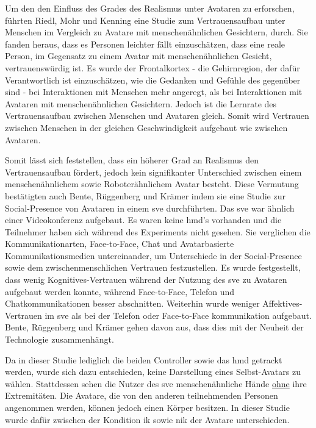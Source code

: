 \documentclass[a4paper,11pt]{article}%
\renewcommand{\\}{\vspace*{0.5\baselineskip} \newline}
\begin{document}
Um den den Einfluss des Grades des Realismus unter Avataren zu erforschen, führten Riedl, Mohr und Kenning \cite{riedl2014trusting} eine Studie zum Vertrauensaufbau unter Menschen im Vergleich zu Avatare mit menschenähnlichen Gesichtern, durch. Sie fanden heraus, dass es Personen leichter fällt einzuschätzen, dass eine reale Person, im Gegensatz zu einem Avatar mit menschenähnlichen Gesicht, vertrauenswürdig ist. Es wurde der Frontalkortex - die Gehirnregion, der dafür Verantwortlich ist einzuschätzen, wie die Gedanken und Gefühle des gegenüber sind - bei Interaktionen mit Menschen mehr angeregt, als bei Interaktionen mit Avataren mit menschenähnlichen Gesichtern.
Jedoch ist die Lernrate des Vertrauensaufbau zwischen Menschen und Avataren gleich. Somit wird Vertrauen zwischen Menschen in der gleichen Geschwindigkeit aufgebaut wie zwischen Avataren. \cite{riedl2014trusting}

Somit lässt sich feststellen, dass ein höherer Grad an Realismus den Vertrauensaufbau fördert, jedoch kein signifikanter Unterschied zwischen einem menschenähnlichem sowie Roboterähnlichem Avatar besteht. Diese Vermutung bestätigten auch Bente, Rüggenberg und Krämer \citep[p.54-59]{bente2004social} indem sie eine Studie zur Social-Presence von Avataren in einem \ac{sve} durchführten. Das \ac{sve} war ähnlich einer Videokonferenz aufgebaut. Es waren keine \ac{hmd}'s vorhanden und die Teilnehmer haben sich während des Experiments nicht gesehen. Sie verglichen die Kommunikationarten, Face-to-Face, Chat und Avatarbasierte Kommunikationsmedien untereinander, um Unterschiede in der Social-Presence sowie dem zwischenmenschlichen Vertrauen festzustellen.
Es wurde festgestellt, dass wenig Kognitives-Vertrauen während der Nutzung des \ac{sve} zu Avataren aufgebaut werden konnte, während Face-to-Face, Telefon und Chatkommunikationen besser abschnitten. Weiterhin wurde weniger Affektives-Vertrauen im \ac{sve} als bei der Telefon oder Face-to-Face kommunikation aufgebaut.
Bente, Rüggenberg und Krämer \citep[p.54-59]{bente2004social} gehen davon aus, dass dies mit der Neuheit der Technologie zusammenhängt.

Da in dieser Studie lediglich die beiden Controller sowie das \ac{hmd} getrackt werden, wurde sich dazu entschieden, keine Darstellung eines Selbst-Avatars zu wählen. Stattdessen sehen die Nutzer des \ac{sve} menschenähnliche Hände \underline{ohne} ihre Extremitäten. Die Avatare, die von den anderen teilnehmenden Personen angenommen werden, können jedoch einen Körper besitzen. In dieser Studie wurde dafür zwischen der Kondition \ac{ik} sowie \ac{nik} der Avatare unterschieden.
\end{document}
